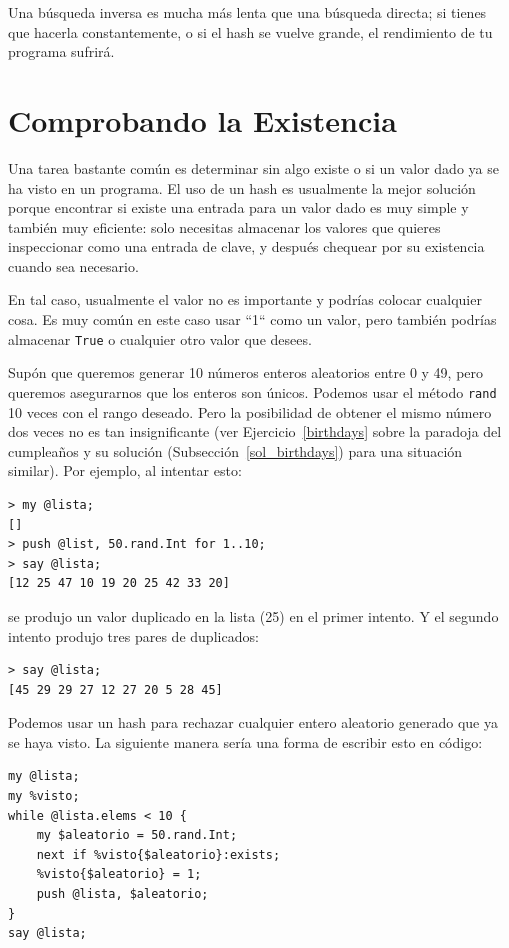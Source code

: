 Una búsqueda inversa es mucha más lenta que una búsqueda directa;
si tienes que hacerla constantemente, o si el hash se vuelve grande,
el rendimiento de tu programa sufrirá.

\section{Comprobando la Existencia}

Una tarea bastante común es determinar sin algo existe o si un valor
dado ya se ha visto en un programa. El uso de un hash es usualmente
la mejor solución porque encontrar si existe una entrada para un valor
dado es muy simple y también muy eficiente: solo necesitas almacenar los
valores que quieres inspeccionar como una entrada de clave, y después 
chequear por su existencia cuando sea necesario.

En tal caso, usualmente el valor no es importante y podrías
colocar cualquier cosa. Es muy común en este caso usar ``1`` como
un valor, pero también podrías almacenar {\tt True} o cualquier
otro valor que desees.

Supón que queremos generar 10 números enteros aleatorios entre 0
y 49, pero queremos asegurarnos que los enteros son únicos. Podemos
usar el método {\tt rand} 10 veces con el rango deseado. Pero la
posibilidad de obtener el mismo número dos veces no es tan
insignificante (ver Ejercicio~\ref{birthdays} sobre la 
paradoja del cumpleaños y su solución (Subsección~\ref{sol_birthdays}) 
para una situación similar). Por ejemplo, al intentar esto:

\begin{verbatim}
> my @lista;
[]
> push @list, 50.rand.Int for 1..10;
> say @lista;
[12 25 47 10 19 20 25 42 33 20]
\end{verbatim}

se produjo un valor duplicado en la lista (25) en el primer intento.
Y el segundo intento produjo tres pares de duplicados:

\begin{verbatim}
> say @lista;
[45 29 29 27 12 27 20 5 28 45]
\end{verbatim}

Podemos usar un hash para rechazar cualquier entero aleatorio
generado que ya se haya visto. La siguiente manera sería una forma
de escribir esto en código:

\begin{verbatim}
my @lista;
my %visto;
while @lista.elems < 10 {
    my $aleatorio = 50.rand.Int;
    next if %visto{$aleatorio}:exists;
    %visto{$aleatorio} = 1;
    push @lista, $aleatorio;
}
say @lista;
\end{verbatim}

